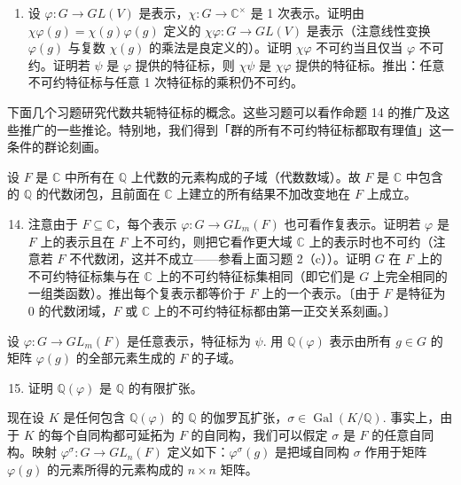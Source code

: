 \begin{enumerate}
（a）若 \(\psi(g) = \psi(1)\)，则 \(g \in \ker\varphi\)；以及

（b）若 \(|\psi(g)| = \psi(1)\) 且 \(\varphi\) 忠实，则 \(g \in Z(G)\)（其中 \(|\psi(g)|\) 是 \(\psi(g)\) 的复绝对值）。〔用命题 14 的证明方法。〕

\item 设 \(\varphi : G \to GL(V)\) 是表示，\(\chi : G \to \mathbb{C}^\times\) 是 1 次表示。证明由 \(\chi\varphi(g) = \chi(g)\varphi(g)\) 定义的 \(\chi\varphi : G \to GL(V)\) 是表示（注意线性变换 \(\varphi(g)\) 与复数 \(\chi(g)\) 的乘法是良定义的）。证明 \(\chi\varphi\) 不可约当且仅当 \(\varphi\) 不可约。证明若 \(\psi\) 是 \(\varphi\) 提供的特征标，则 \(\chi\psi\) 是 \(\chi\varphi\) 提供的特征标。推出：任意不可约特征标与任意 1 次特征标的乘积仍不可约。
\end{enumerate}

下面几个习题研究代数共轭特征标的概念。这些习题可以看作命题 14 的推广及这些推广的一些推论。特别地，我们得到「群的所有不可约特征标都取有理值」这一条件的群论刻画。

设 \(F\) 是 \(\mathbb{C}\) 中所有在 \(\mathbb{Q}\) 上代数的元素构成的子域（代数数域）。故 \(F\) 是 \(\mathbb{C}\) 中包含的 \(\mathbb{Q}\) 的代数闭包，且前面在 \(\mathbb{C}\) 上建立的所有结果不加改变地在 \(F\) 上成立。

\begin{enumerate}
\setcounter{enumi}{13}
\item 注意由于 \(F \subseteq \mathbb{C}\)，每个表示 \(\varphi : G \to GL_m(F)\) 也可看作复表示。证明若 \(\varphi\) 是 \(F\) 上的表示且在 \(F\) 上不可约，则把它看作更大域 \(\mathbb{C}\) 上的表示时也不可约（注意若 \(F\) 不代数闭，这并不成立——参看上面习题 2（c））。证明 \(G\) 在 \(F\) 上的不可约特征标集与在 \(\mathbb{C}\) 上的不可约特征标集相同（即它们是 \(G\) 上完全相同的一组类函数）。推出每个复表示都等价于 \(F\) 上的一个表示。〔由于 \(F\) 是特征为 0 的代数闭域，\(F\) 或 \(\mathbb{C}\) 上的不可约特征标都由第一正交关系刻画。〕
\end{enumerate}

设 \(\varphi : G \to GL_m(F)\) 是任意表示，特征标为 \(\psi\). 用 \(\mathbb{Q}(\varphi)\) 表示由所有 \(g \in G\) 的矩阵 \(\varphi(g)\) 的全部元素生成的 \(F\) 的子域。

\begin{enumerate}
\setcounter{enumi}{14}
\item 证明 \(\mathbb{Q}(\varphi)\) 是 \(\mathbb{Q}\) 的有限扩张。
\end{enumerate}

现在设 \(K\) 是任何包含 \(\mathbb{Q}(\varphi)\) 的 \(\mathbb{Q}\) 的伽罗瓦扩张，\(\sigma \in \operatorname{Gal}(K/\mathbb{Q})\). 事实上，由于 \(K\) 的每个自同构都可延拓为 \(F\) 的自同构，我们可以假定 \(\sigma\) 是 \(F\) 的任意自同构。映射 \(\varphi^\sigma : G \to GL_n(F)\) 定义如下：\(\varphi^\sigma(g)\) 是把域自同构 \(\sigma\) 作用于矩阵 \(\varphi(g)\) 的元素所得的元素构成的 \(n \times n\) 矩阵。

